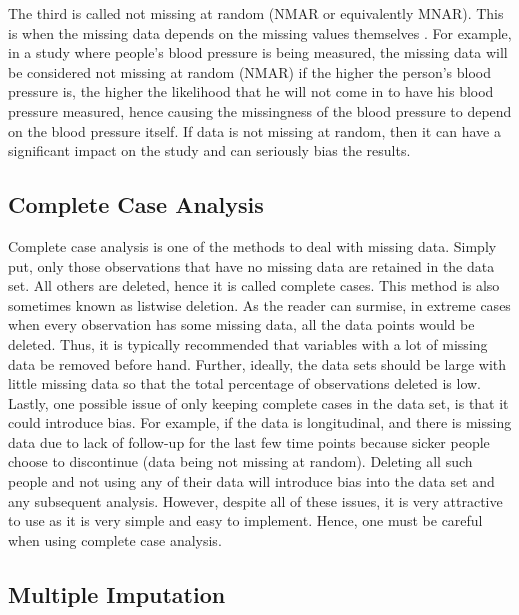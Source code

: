 \documentclass[fleqn,10pt]{wlscirep}\usepackage[]{graphicx}\usepackage[]{color}
\begin{document}
The third is called not missing at random (NMAR or equivalently MNAR). This is when the missing data depends on the missing values themselves \cite{allison2012handling}. For example, in a study where people's blood pressure is being measured, the missing data will be considered not missing at random (NMAR) if the higher the person's blood pressure is, the higher the likelihood that he will not come in to have his blood pressure measured, hence causing the missingness of the blood pressure to depend on the blood pressure itself. If data is not missing at random, then it can have a significant impact on the study and can seriously bias the results. 

\subsection{Complete Case Analysis}

Complete case analysis is one of the methods to deal with missing data. Simply put, only those observations that have no missing data are retained in the data set. All others are deleted, hence it is called complete cases. This method is also sometimes known as listwise deletion. As the reader can surmise, in extreme cases when every observation has some missing data, all the data points would be deleted. Thus, it is typically recommended that variables with a lot of missing data be removed before hand. Further, ideally, the data sets should be large with little missing data so that the total percentage of observations deleted is low. Lastly, one possible issue of only keeping complete cases in the data set, is that it could introduce bias. For example, if the data is longitudinal, and there is missing data due to lack of follow-up for the last few time points because sicker people choose to discontinue (data being not missing at random). Deleting all such people and not using any of their data will introduce bias into the data set and any subsequent analysis. However, despite all of these issues, it is very attractive to use as it is very simple and easy to implement. Hence, one must be careful when using complete case analysis. 

\subsection{Multiple Imputation}
\end{document}
